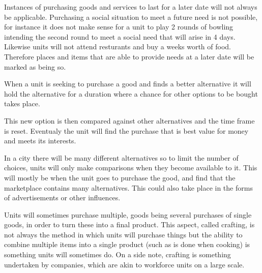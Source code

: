 Instances of purchasing goods and services to last for a later date will not always be applicable. Purchasing a social situation to meet a future need is not possible, for instance it does not make sense for a unit to play 2 rounds of bowling intending the second round to meet a social need that will arise in 4 days. Likewise units will not attend resturants and buy a weeks worth of food. Therefore places and items that are able to provide needs at a later date will be marked as being so.




When a unit is seeking to purchase a good and finds a better alternative it will hold the alternative for a duration where a chance for other options to be bought takes place.

This new option is then compared against other alternatives and the time frame is reset. Eventualy the unit will find the purchase that is best value for money and meets its interests.

In a city there will be many different alternatives so to limit the number of choices, units will only make comparisons when they become available to it. This will mostly be when the unit goes to purchase the good, and find that the marketplace contains many alternatives. This could also take place in the forms of advertisements or other influences.




Units will sometimes purchase multiple, goods being several purchases of single goods, in order to turn these into a final product. This aspect, called crafting, is not always the method in which units will purchase things but the ability to combine multiple items into a single product (such as is done when cooking) is something units will sometimes do. On a side note, crafting is something undertaken by companies, which are akin to workforce units on a large scale.

